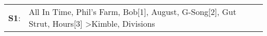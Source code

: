 \begin{supertabular}{p{0.03\textwidth}p{0.92\textwidth}}
 \textbf{S1}:  &  All In Time\textsuperscript{}, \enspace Phil's Farm\textsuperscript{}, \enspace Bob[1]\textsuperscript{}, \enspace August\textsuperscript{}, \enspace G-Song[2]\textsuperscript{}, \enspace Gut Strut\textsuperscript{}, \enspace Hours[3]\textsuperscript{} \textgreater \enspace Kimble\textsuperscript{}, \enspace Divisions\textsuperscript{}  \enspace  \\
\end{supertabular}

